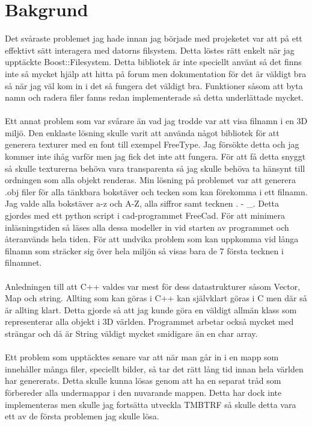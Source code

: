 \section{Bakgrund}
Det svåraste problemet jag hade innan jag började med projeketet var att på ett effektivt sätt interagera med datorns filsystem. Detta löstes rätt enkelt när jag upptäckte Boost::Filesystem. Detta bibliotek är inte speciellt använt så det finns inte så mycket hjälp att hitta på forum men dokumentation för det är väldigt bra så när jag väl kom in i det så fungera det väldigt bra. Funktioner såsom att byta namn och radera filer fanns redan implementerade så detta underlättade mycket.
\\
\\
Ett annat problem som var svårare än vad jag trodde var att visa filnamn i en 3D miljö. Den enklaste lösning skulle varit att använda något bibliotek för att generera texturer med en font till exempel FreeType. Jag försökte detta och jag kommer inte ihåg varför men jag fick det inte att fungera. För att få detta snyggt så skulle texturerna behöva vara transparenta så jag skulle behöva ta hänsynt till ordningen som alla objekt renderas. Min lösning på problemet var att generera .obj filer för alla tänkbara bokstäver och tecken som kan förekomma i ett filnamn. Jag valde alla bokstäver a-z och A-Z, alla siffror samt tecknen . - \_. Detta gjordes med ett python script i cad-programmet FreeCad. För att minimera inläsningstiden så läses alla dessa modeller in vid starten av programmet och återanvänds hela tiden. För att undvika problem som kan uppkomma vid långa filnamn som sträcker sig över hela miljön så visas bara de 7 första tecknen i filnamnet.
\\
\\
Anledningen till att C++ valdes var mest för dess datastrukturer såsom Vector, Map och string. Allting som kan göras i C++ kan självklart göras i C men där så är allting klart. Detta gjorde så att jag kunde göra en väldigt allmän klass som representerar alla objekt i 3D världen. Programmet arbetar också mycket med strängar och då är String väldigt mycket smidigare än en char array.
\\
\\
Ett problem som upptäcktes senare var att när man går in i en mapp som innehåller många filer, speciellt bilder, så tar det rätt lång tid innan hela världen har genererats. Detta skulle kunna lösas genom att ha en separat tråd som förbereder alla undermappar i den nuvarande mappen. Detta har dock inte implementeras men skulle jag fortsätta utveckla TMBTRF så skulle detta vara ett av de första problemen jag skulle lösa. 
